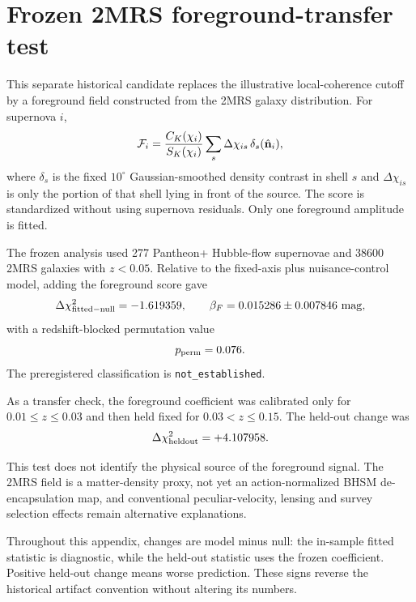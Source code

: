 \section{Frozen 2MRS foreground-transfer test}
\label{sec:2mrs-foreground-transfer}

This separate historical candidate replaces the illustrative local-coherence
cutoff by a foreground
field constructed from the 2MRS galaxy distribution.  For supernova \(i\),
\[
{\cal F}_i =
\frac{C_K(\chi_i)}{S_K(\chi_i)}
\sum_s
\Delta\chi_{is}\,
\delta_s(\hat{\mathbf n}_i),
\]
where \(\delta_s\) is the fixed \(10^\circ\) Gaussian-smoothed density contrast
in shell \(s\) and \(\Delta\chi_{is}\) is only the portion of that shell lying
in front of the source.  The score is standardized without using supernova
residuals.  Only one foreground amplitude is fitted.

The frozen analysis used 277 Pantheon+ Hubble-flow
supernovae and 38600 2MRS galaxies with
\(z<0.05\).  Relative to the fixed-axis plus nuisance-control model, adding
the foreground score gave
\[
\Delta\chi^2_{\rm fitted-null} = -1.619359,
\qquad
\beta_F = 0.015286
\pm 0.007846\ {\rm mag},
\]
with a redshift-blocked permutation value
\[
p_{\rm perm}=0.076.
\]
The preregistered classification is
\texttt{not\_established}.

As a transfer check, the foreground coefficient was calibrated only for
\(0.01\le z\le0.03\) and then held fixed for \(0.03<z\le0.15\).  The held-out
change was
\[
\Delta\chi^2_{\rm heldout}
=
+4.107958.
\]

This test does not identify the physical source of the foreground signal.
The 2MRS field is a matter-density proxy, not yet an action-normalized BHSM
de-encapsulation map, and conventional peculiar-velocity, lensing and survey
selection effects remain alternative explanations.

Throughout this appendix, changes are model minus null: the in-sample
fitted statistic is diagnostic, while the held-out statistic uses the frozen
coefficient. Positive held-out change means worse prediction. These signs
reverse the historical artifact convention without altering its numbers.
